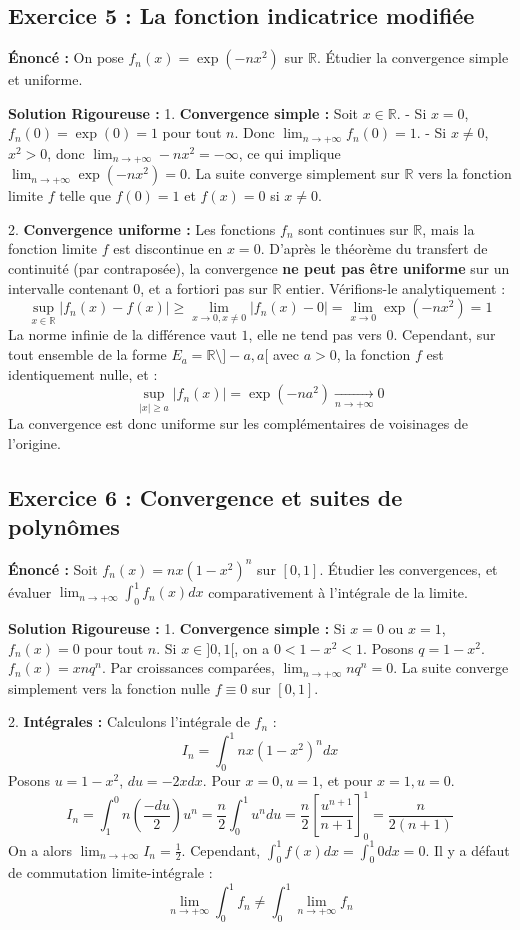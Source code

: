 \documentclass[11pt,a4paper]{article}
\begin{document}
\subsection*{Exercice 5 : La fonction indicatrice modifiée}
\textbf{Énoncé :}
On pose $f_n(x) = \exp(-n x^2)$ sur $\mathbb{R}$.
Étudier la convergence simple et uniforme.

\textbf{Solution Rigoureuse :}
1. \textbf{Convergence simple :}
Soit $x \in \mathbb{R}$.
- Si $x = 0$, $f_n(0) = \exp(0) = 1$ pour tout $n$. Donc $\lim_{n \to +\infty} f_n(0) = 1$.
- Si $x \neq 0$, $x^2 > 0$, donc $\lim_{n \to +\infty} -n x^2 = -\infty$, ce qui implique $\lim_{n \to +\infty} \exp(-n x^2) = 0$.
La suite converge simplement sur $\mathbb{R}$ vers la fonction limite $f$ telle que $f(0) = 1$ et $f(x) = 0$ si $x \neq 0$.

2. \textbf{Convergence uniforme :}
Les fonctions $f_n$ sont continues sur $\mathbb{R}$, mais la fonction limite $f$ est discontinue en $x=0$.
D'après le théorème du transfert de continuité (par contraposée), la convergence \textbf{ne peut pas être uniforme} sur un intervalle contenant $0$, et a fortiori pas sur $\mathbb{R}$ entier.
Vérifions-le analytiquement :
$$\sup_{x \in \mathbb{R}} |f_n(x) - f(x)| \ge \lim_{x \to 0, x \neq 0} |f_n(x) - 0| = \lim_{x \to 0} \exp(-n x^2) = 1$$
La norme infinie de la différence vaut $1$, elle ne tend pas vers $0$.
Cependant, sur tout ensemble de la forme $E_a = \mathbb{R} \setminus ]-a, a[$ avec $a > 0$, la fonction $f$ est identiquement nulle, et :
$$\sup_{|x| \ge a} |f_n(x)| = \exp(-n a^2) \xrightarrow[n \to +\infty]{} 0$$
La convergence est donc uniforme sur les complémentaires de voisinages de l'origine.


\subsection*{Exercice 6 : Convergence et suites de polynômes}
\textbf{Énoncé :}
Soit $f_n(x) = n x (1 - x^2)^n$ sur $[0, 1]$. Étudier les convergences, et évaluer $\lim_{n \to +\infty} \int_0^1 f_n(x) dx$ comparativement à l'intégrale de la limite.

\textbf{Solution Rigoureuse :}
1. \textbf{Convergence simple :}
Si $x = 0$ ou $x = 1$, $f_n(x) = 0$ pour tout $n$.
Si $x \in ]0, 1[$, on a $0 < 1 - x^2 < 1$. Posons $q = 1 - x^2$. $f_n(x) = x n q^n$.
Par croissances comparées, $\lim_{n \to +\infty} n q^n = 0$.
La suite converge simplement vers la fonction nulle $f \equiv 0$ sur $[0, 1]$.

2. \textbf{Intégrales :}
Calculons l'intégrale de $f_n$ :
$$I_n = \int_0^1 n x (1 - x^2)^n dx$$
Posons $u = 1 - x^2$, $du = -2x dx$. Pour $x=0, u=1$, et pour $x=1, u=0$.
$$I_n = \int_1^0 n \left( \frac{-du}{2} \right) u^n = \frac{n}{2} \int_0^1 u^n du = \frac{n}{2} \left[ \frac{u^{n+1}}{n+1} \right]_0^1 = \frac{n}{2(n+1)}$$
On a alors $\lim_{n \to +\infty} I_n = \frac{1}{2}$.
Cependant, $\int_0^1 f(x) dx = \int_0^1 0 dx = 0$.
Il y a défaut de commutation limite-intégrale :
$$\lim_{n \to +\infty} \int_0^1 f_n \neq \int_0^1 \lim_{n \to +\infty} f_n$$
\end{document}
